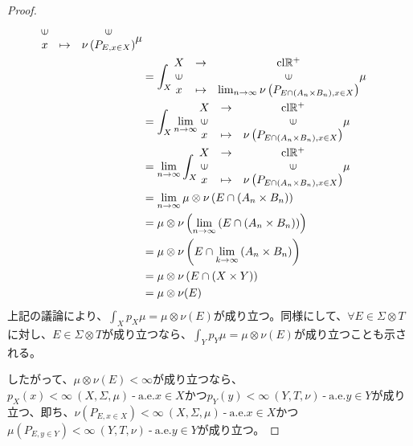 \documentclass[dvipdfmx]{jsarticle}
\begin{document}
\begin{proof}
\begin{align*}
{\begin{matrix}
\text{\rotatebox[origin=c]{90}{$\in$}} & & \text{\rotatebox[origin=c]{90}{$\in$}} \\
x & \mapsto & \nu\left( P_{E,x \in X} \right) \\
\end{matrix}\mu}\\
&= \int_{X} {\begin{matrix}
X & \rightarrow & \mathrm{cl}\mathbb{R}^{+} \\
\text{\rotatebox[origin=c]{90}{$\in$}} & & \text{\rotatebox[origin=c]{90}{$\in$}} \\
x & \mapsto & \lim_{n \rightarrow \infty}{\nu\left( P_{E \cap \left( A_{n} \times B_{n} \right),x \in X} \right)} \\
\end{matrix}\mu}\\
&= \int_{X} {\lim_{n \rightarrow \infty}\begin{matrix}
X & \rightarrow & \mathrm{cl}\mathbb{R}^{+} \\
\text{\rotatebox[origin=c]{90}{$\in$}} & & \text{\rotatebox[origin=c]{90}{$\in$}} \\
x & \mapsto & \nu\left( P_{E \cap \left( A_{n} \times B_{n} \right),x \in X} \right) \\
\end{matrix}\mu}\\
&= \lim_{n \rightarrow \infty}{\int_{X} {\begin{matrix}
X & \rightarrow & \mathrm{cl}\mathbb{R}^{+} \\
\text{\rotatebox[origin=c]{90}{$\in$}} & & \text{\rotatebox[origin=c]{90}{$\in$}} \\
x & \mapsto & \nu\left( P_{E \cap \left( A_{n} \times B_{n} \right),x \in X} \right) \\
\end{matrix}\mu}}\\
&= \lim_{n \rightarrow \infty}{\mu \otimes \nu\left( E \cap \left( A_{n} \times B_{n} \right) \right)}\\
&= \mu \otimes \nu\left( \lim_{n \rightarrow \infty}\left( E \cap \left( A_{n} \times B_{n} \right) \right) \right)\\
&= \mu \otimes \nu\left( E \cap \lim_{k \rightarrow \infty}\left( A_{n} \times B_{n} \right) \right)\\
&= \mu \otimes \nu\left( E \cap (X \times Y) \right)\\
&= \mu \otimes \nu(E)
\end{align*}
上記の議論により、$\int_{X} {p_{X}\mu} = \mu \otimes \nu(E)$が成り立つ。同様にして、$\forall E \in \varSigma \otimes T$に対し、$E \in \varSigma \otimes T$が成り立つなら、$\int_{Y} {p_{Y}\mu} = \mu \otimes \nu(E)$が成り立つことも示される。\par
したがって、$\mu \otimes \nu(E) < \infty$が成り立つなら、$p_{X}(x) < \infty\ (X,\varSigma,\mu) \ \text{-} \ \mathrm{a.e.}x \in X$かつ$p_{Y}(y) < \infty\ (Y,T,\nu) \ \text{-} \ \mathrm{a.e.}y \in Y$が成り立つ、即ち、$\nu\left( P_{E,x \in X} \right) < \infty\ (X,\varSigma,\mu) \ \text{-} \ \mathrm{a.e.}x \in X$かつ$\mu\left( P_{E,y \in Y} \right) < \infty\ (Y,T,\nu) \ \text{-} \ \mathrm{a.e.}y \in Y$が成り立つ。
\end{proof}
\end{document}
